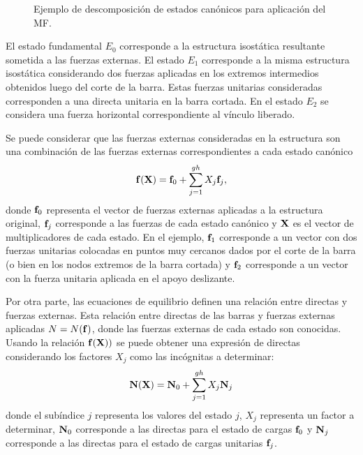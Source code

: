 \begin{figure}[htb]
	\centering
	\def\svgwidth{0.95\textwidth}

	\caption{Ejemplo de descomposición de estados canónicos para aplicación del MF.}
	\label{fig:estadoscanon}
\end{figure}

El estado fundamental $E_0$ corresponde a la estructura isostática resultante sometida a las fuerzas externas. %
%
El estado $E_1$ corresponde a la misma estructura isostática considerando dos fuerzas aplicadas en los extremos intermedios obtenidos luego del corte de la barra. Estas fuerzas unitarias consideradas corresponden a una directa unitaria en la barra cortada. %
%
En el estado $E_2$ se considera una fuerza horizontal correspondiente al vínculo liberado.
%



Se puede considerar que las fuerzas externas consideradas en la estructura son una combinación de las fuerzas externas correspondientes a cada estado canónico
%
\begin{equation}\label{eqn:fueX}
{\bf f}({\bf X}) = {\bf f}_0 + \sum_{j=1}^{gh} X_j {\bf f}_j,
\end{equation}
donde  ${\bf f}_0$ representa el vector de fuerzas externas aplicadas a la estructura original, ${\bf f}_j$ corresponde a las fuerzas de cada estado canónico y ${\bf X}$ es el vector de multiplicadores de cada estado.
%
En el ejemplo, ${\bf f}_1$ corresponde a un vector con dos fuerzas unitarias colocadas en puntos muy cercanos dados por el corte de la barra (o bien en los nodos extremos de la barra cortada) y ${\bf f}_2$ corresponde a un vector con la fuerza unitaria aplicada en el apoyo deslizante.

Por otra parte, las ecuaciones de equilibrio definen una relación entre directas y fuerzas externas. %
Esta relación entre directas de las barras y fuerzas externas aplicadas $N=N({\bf f})$, donde las fuerzas externas de cada estado son conocidas. %
%
Usando la relación ${\bf f}({\bf X}))$ se puede obtener una expresión de directas considerando los factores $X_j$ como las incógnitas a determinar:
%
\begin{equation}\label{eqn:estadosdirectas}
\textbf{N}({\bf X}) = \textbf{N}_0 + \sum_{j=1}^{gh} X_j \textbf{N}_j
\end{equation}
%
donde el subíndice $j$ representa los valores del estado $j$, $X_j$ representa un factor a determinar, ${\bf N}_0$ corresponde a las directas para el estado de cargas ${\bf f}_0$ y ${\bf N}_j$ corresponde a las directas para el estado de cargas unitarias ${\bf f}_j$.
%


